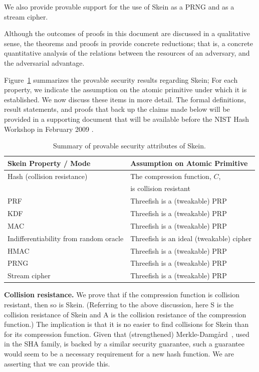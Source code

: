 \documentclass[11pt,twoside]{article}
\begin{document}
We also provide provable support for the use of Skein as a PRNG and as a stream cipher.

Although the outcomes of proofs in this document are discussed in a qualitative sense, the theorems and proofs in \cite{BK09} provide concrete reductions; that is, a concrete quantitative analysis of the relations between the resources of an adversary, and the adversarial advantage. 

Figure~\ref{tab:provable-attributes} summarizes the provable security results regarding Skein;   For each property, we indicate the assumption on the atomic primitive under which it is established. We now discuss these items in more detail. The formal definitions, result statements, and proofs that back up the claims made below will be provided in a supporting document that will be available before the NIST Hash Workshop in February 2009 \cite{BK09}.
%
\renewcommand{\arraystretch}{1.3}
\begin{table}[tbph]
\begin{center}
\begin{tabular}{|l|l|}
\hline
Skein Property / Mode & Assumption on Atomic Primitive  \\
\hline
Hash (collision resistance) & The compression function, $C$, \\
                            & is collision resistant  \\
PRF & Threefish is a (tweakable) PRP \\
KDF & Threefish is a (tweakable) PRP \\
MAC & Threefish is a (tweakable) PRP \\
Indifferentiability from random oracle & Threefish is an ideal (tweakable) cipher  \\
HMAC & Threefish is a (tweakable) PRP \\
PRNG & Threefish is a (tweakable) PRP \\
Stream cipher & Threefish is a (tweakable) PRP \\
\hline
\end{tabular}
\end{center}
\caption{Summary of provable security attributes of Skein.}
\label{tab:provable-attributes}
\end{table}
\renewcommand{\arraystretch}{1}

{\bf Collision resistance.}  We prove that if the compression function is collision resistant, then so is Skein.  (Referring to the above discussion, here S is the collision resistance of Skein and A is the collision resistance of the compression function.) The implication is that it is no easier to find collisions for Skein than for its compression function.  Given that (strengthened) Merkle-Damg{\aa}rd~\cite{MD,Mer89a}, used in the SHA family, is backed by a similar security guarantee, such a guarantee would seem to be a necessary requirement for a new hash function.  We are asserting that we can provide this.
\end{document}
